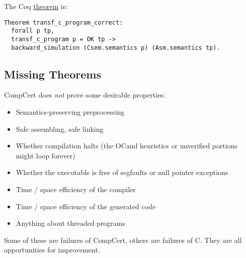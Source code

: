 The Coq \href{https://github.com/AbsInt/CompCert/blob/master/driver/Compiler.v#L367}{theorem} is:
\begin{lstlisting}[style=Coq]
Theorem transf_c_program_correct:
  forall p tp,
  transf_c_program p = OK tp ->
  backward_simulation (Csem.semantics p) (Asm.semantics tp).
\end{lstlisting}


\subsection{Missing Theorems}

CompCert does \emph{not} prove some desirable properties:
\begin{itemize}
\item Semantics-preserving preprocessing
\item Safe assembling, safe linking
\item Whether compilation halts (the OCaml heuristics or unverified portions might loop forever)
\item Whether the executable is free of segfaults or null pointer exceptions
\item Time / space efficiency of the compiler
\item Time / space efficiency of the generated code
\item Anything about threaded programs
\end{itemize}

Some of these are failures of CompCert, others are failures of C.
They are all opportunities for improvement.





